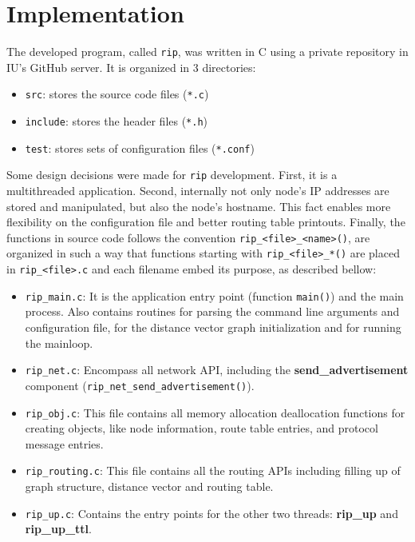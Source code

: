 \documentclass[10pt]{extarticle}
\begin{document}
\section{Implementation}

The developed program, called \texttt{rip}, was written in C using a private
repository in IU's GitHub server. It is organized in 3 directories:

\begin{itemize}
\item{\texttt{src}:} stores the source code files (\texttt{*.c})
\item{\texttt{include}:} stores the header files (\texttt{*.h})
\item{\texttt{test}:} stores sets of configuration files (\texttt{*.conf})
\end{itemize}

Some design decisions were made for \texttt{rip} development. First, it is a
multithreaded application. Second, internally not only node's IP addresses are
stored and manipulated, but also the node's hostname. This fact enables more
flexibility on the configuration file and better routing table
printouts. Finally, the functions in source code follows the convention
\texttt{rip\_<file>\_<name>()}, are organized in such a way that 
functions starting with \texttt{rip\_<file>\_*()} are placed in \texttt{rip\_<file>.c}
and each filename embed its purpose, as described bellow:
\begin{itemize}
\item{\texttt{rip\_main.c}:} It is the application entry point (function
  \texttt{main()}) and the main process. Also contains routines for parsing the
  command line arguments and configuration file, for the distance vector
  graph initialization and for running the mainloop. 
\item{\texttt{rip\_net.c}:} Encompass all network API, including the
  \textbf{send\_advertisement} component
  (\texttt{rip\_net\_send\_advertisement()}).
\item{\texttt{rip\_obj.c}:} This file contains all memory allocation
  deallocation functions for creating objects, like node information, route
  table entries, and protocol message entries.
\item{\texttt{rip\_routing.c}:} This file contains all the routing APIs including filling up of graph structure, distance vector and routing table.   
\item{\texttt{rip\_up.c}:} Contains the entry points for the other two threads:
  \textbf{rip\_up} and \textbf{rip\_up\_ttl}.
\end{itemize}
\end{document}
